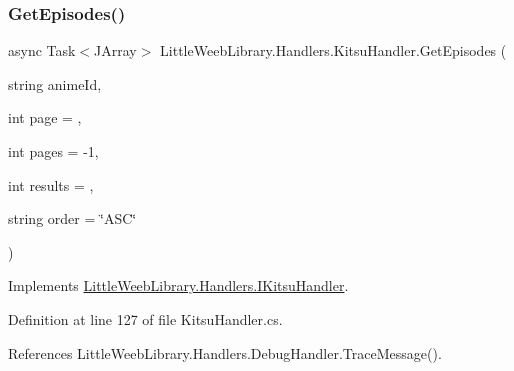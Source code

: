\mbox{\label{class_little_weeb_library_1_1_handlers_1_1_kitsu_handler_a615caf4bea96465d35eb36434bc71bea}} 
\subsubsection{\texorpdfstring{Get\+Episodes()}{GetEpisodes()}}
{\footnotesize\ttfamily async Task$<$J\+Array$>$ Little\+Weeb\+Library.\+Handlers.\+Kitsu\+Handler.\+Get\+Episodes (\begin{DoxyParamCaption}\item[{string}]{anime\+Id,  }\item[{int}]{page = {},  }\item[{int}]{pages = {\ttfamily -\/1},  }\item[{int}]{results = {},  }\item[{string}]{order = {\ttfamily \char`\"{}ASC\char`\"{}} }\end{DoxyParamCaption})}



Implements \mbox{\hyperlink{interface_little_weeb_library_1_1_handlers_1_1_i_kitsu_handler_adc4f3c45aec996b1f94894368f818de4}{Little\+Weeb\+Library.\+Handlers.\+I\+Kitsu\+Handler}}.



Definition at line 127 of file Kitsu\+Handler.\+cs.



References Little\+Weeb\+Library.\+Handlers.\+Debug\+Handler.\+Trace\+Message().


